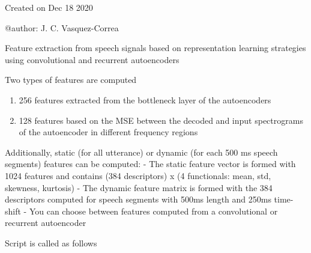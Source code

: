 \documentclass[letterpaper,10pt,english]{sphinxmanual}
\let\sphinxpxdimen\pdfpxdimen\else\newdimen\sphinxpxdimen
\begin{document}
\noindent\sphinxincludegraphics[width=600\sphinxpxdimen]{{replearning_error}.png}
\label{\detokenize{RepLearning:module-replearning}}
Created on Dec 18 2020

@author: J. C. Vasquez-Correa

\begin{fulllineitems}
\label{\detokenize{RepLearning:replearning.RepLearning}}
Feature extraction from speech signals based on representation learning strategies using convolutional and recurrent autoencoders

Two types of features are computed
\begin{enumerate}
\item {} 
256 features extracted from the bottleneck layer of the autoencoders

\item {} 
128 features based on the MSE between the decoded and input spectrograms of the autoencoder in different frequency regions

\end{enumerate}

Additionally, static (for all utterance) or dynamic (for each 500 ms speech segments) features can be computed:
- The static feature vector is formed with 1024 features and contains (384 descriptors) x (4 functionals: mean, std, skewness, kurtosis)
- The dynamic feature matrix is formed with the 384 descriptors computed for speech segments with 500ms length and 250ms time-shift
- You can choose between features computed from a convolutional or recurrent autoencoder

Script is called as follows

\begin{sphinxVerbatim}[commandchars=\\\{\}]
                    
\end{sphinxVerbatim}


\end{fulllineitems}
\end{document}
